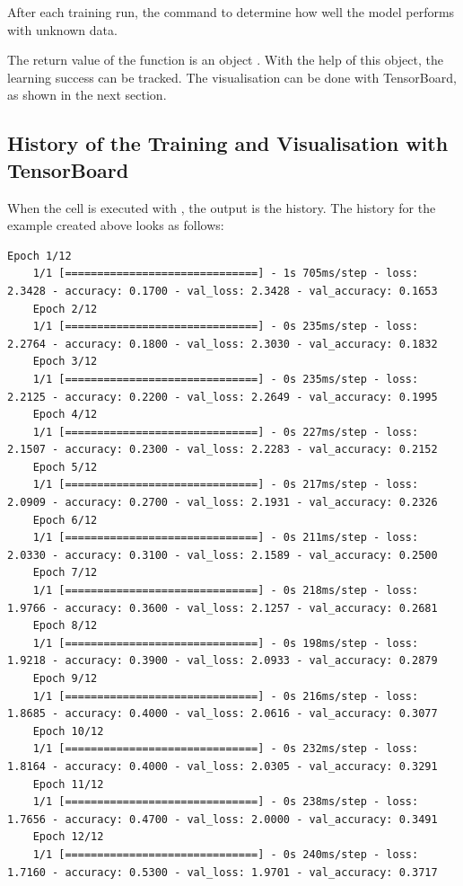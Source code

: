 After each training run, the command 
to determine how well the model performs with unknown data.

The return value of the function  is an object . With the help of this object, the learning success can be tracked. The visualisation can be done with TensorBoard, as shown in the next section.


\subsection{History of the Training and Visualisation with TensorBoard}

When the cell is executed with , the output is the history. The history for the example created above looks as follows:

\begin{lstlisting}[numbers=none]
    Epoch 1/12
    1/1 [==============================] - 1s 705ms/step - loss: 2.3428 - accuracy: 0.1700 - val_loss: 2.3428 - val_accuracy: 0.1653
    Epoch 2/12
    1/1 [==============================] - 0s 235ms/step - loss: 2.2764 - accuracy: 0.1800 - val_loss: 2.3030 - val_accuracy: 0.1832
    Epoch 3/12
    1/1 [==============================] - 0s 235ms/step - loss: 2.2125 - accuracy: 0.2200 - val_loss: 2.2649 - val_accuracy: 0.1995
    Epoch 4/12
    1/1 [==============================] - 0s 227ms/step - loss: 2.1507 - accuracy: 0.2300 - val_loss: 2.2283 - val_accuracy: 0.2152
    Epoch 5/12
    1/1 [==============================] - 0s 217ms/step - loss: 2.0909 - accuracy: 0.2700 - val_loss: 2.1931 - val_accuracy: 0.2326
    Epoch 6/12
    1/1 [==============================] - 0s 211ms/step - loss: 2.0330 - accuracy: 0.3100 - val_loss: 2.1589 - val_accuracy: 0.2500
    Epoch 7/12
    1/1 [==============================] - 0s 218ms/step - loss: 1.9766 - accuracy: 0.3600 - val_loss: 2.1257 - val_accuracy: 0.2681
    Epoch 8/12
    1/1 [==============================] - 0s 198ms/step - loss: 1.9218 - accuracy: 0.3900 - val_loss: 2.0933 - val_accuracy: 0.2879
    Epoch 9/12
    1/1 [==============================] - 0s 216ms/step - loss: 1.8685 - accuracy: 0.4000 - val_loss: 2.0616 - val_accuracy: 0.3077
    Epoch 10/12
    1/1 [==============================] - 0s 232ms/step - loss: 1.8164 - accuracy: 0.4000 - val_loss: 2.0305 - val_accuracy: 0.3291
    Epoch 11/12
    1/1 [==============================] - 0s 238ms/step - loss: 1.7656 - accuracy: 0.4700 - val_loss: 2.0000 - val_accuracy: 0.3491
    Epoch 12/12
    1/1 [==============================] - 0s 240ms/step - loss: 1.7160 - accuracy: 0.5300 - val_loss: 1.9701 - val_accuracy: 0.3717
\end{lstlisting}

